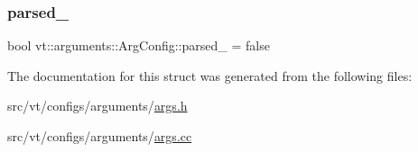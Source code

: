 \mbox{\label{structvt_1_1arguments_1_1_arg_config_a710f4894651d38778f924c5d5f340d96}} 
\subsubsection{\texorpdfstring{parsed\+\_\+}{parsed\_}}
{\footnotesize\ttfamily bool vt\+::arguments\+::\+Arg\+Config\+::parsed\+\_\+ = false\hspace{0.3cm}{\ttfamily [private]}}



The documentation for this struct was generated from the following files\+:\begin{DoxyCompactItemize}
\item 
src/vt/configs/arguments/\hyperlink{args_8h}{args.\+h}\item 
src/vt/configs/arguments/\hyperlink{args_8cc}{args.\+cc}\end{DoxyCompactItemize}
